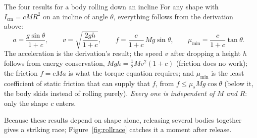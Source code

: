 \begin{keybox}{The four results for a body rolling down an incline}
For any shape with $I_{\text{cm}}=cMR^2$ on an incline of angle $\theta$, everything follows from the
derivation above:
\[
a=\frac{g\sin\theta}{1+c},\qquad
v=\sqrt{\frac{2gh}{1+c}},\qquad
f=\frac{c}{1+c}\,Mg\sin\theta,\qquad
\mu_{\min}=\frac{c}{1+c}\tan\theta.
\]
The acceleration is the derivation's result; the speed $v$ after dropping a height $h$ follows from energy
conservation, $Mgh=\tfrac12Mv^2(1+c)$ (friction does no work); the friction $f=cMa$ is what the torque
equation requires; and $\mu_{\min}$ is the least coefficient of static friction
that can supply that $f$, from $f\le\mu_s Mg\cos\theta$ (below it, the body skids instead of rolling purely).
\emph{Every one is independent of $M$ and $R$}: only the shape $c$ enters.
\end{keybox}

\begin{figure}[htbp]
\centering
{}
\end{figure}

Because these results depend on shape alone, releasing several bodies together gives a striking race;
Figure~\ref{fig:rollrace} catches it a moment after release.

